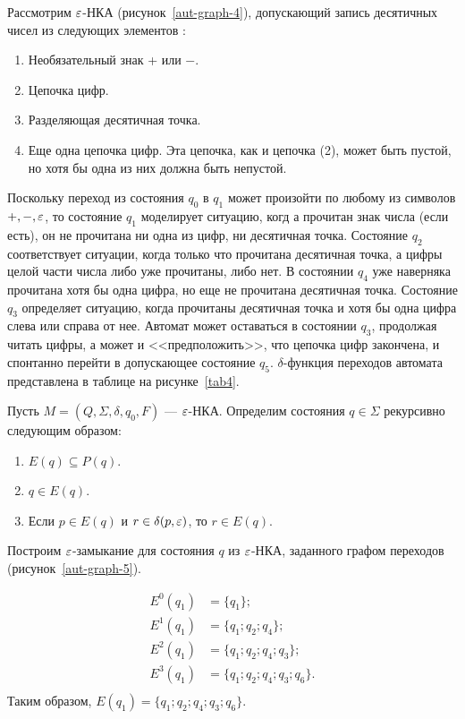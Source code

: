 \begin{myexample}
Рассмотрим $\varepsilon$-НКА (рисунок~\ref{aut-graph-4}), допускающий запись десятичных чисел из следующих элементов $\colon$
\begin{enumerate}
   \item Необязательный знак + или $-$.
   \item Цепочка цифр.
   \item Разделяющая десятичная точка.
   \item Еще одна цепочка цифр. Эта цепочка, как и цепочка (2), может быть пустой, но хотя бы одна из них должна быть непустой.
\end{enumerate}


Поскольку переход из состояния $q_0$ в $q_1$ может произойти по любому из символов $+, -, \varepsilon$, то состояние $q_1$ моделирует ситуацию, когд а прочитан знак числа (если есть), он не прочитана ни одна из цифр, ни десятичная точка. Состояние $q_2$ соответствует ситуации, когда только что прочитана десятичная точка, а цифры целой части числа либо уже прочитаны, либо нет. В состоянии $q_4$ уже наверняка прочитана хотя бы одна цифра, но еще не прочитана десятичная точка. Состояние $q_3$ определяет ситуацию, когда  прочитаны десятичная точка и хотя бы одна цифра слева или справа от нее. Автомат может оставаться в состоянии $q_3$, продолжая читать цифры, а может и <<предположить>>, что цепочка цифр закончена, и спонтанно перейти в допускающее состояние $q_5$.
$\delta$-функция переходов автомата представлена в таблице на рисунке~\ref{tab4}.
\end{myexample}



Пусть $M = (Q,\Sigma, \delta, q_0, F)$ --- $\varepsilon$-НКА. Определим  состояния $q \in \Sigma$ рекурсивно следующим образом:
\begin{enumerate}
   \item $E(q) \subseteq P(q)$.
   \item $q \in E(q)$.
   \item Если $p \in E(q)$ и $r \in \delta(p, \varepsilon)$, то $r \in E(q)$.
\end{enumerate}

\begin{myexample}
\label{example-413}
Построим $\varepsilon$-замыкание для состояния $q$ из $\varepsilon$-НКА, заданного графом переходов (рисунок~\ref{aut-graph-5}).

\begin{align*}
    E^0(q_1) &= \{q_1\}; \\
    E^1(q_1) &= \{ q_1; q_2; q_4 \};\\
    E^2(q_1) &= \{ q_1; q_2; q_4; q_3 \}; \\
    E^3(q_1) &= \{ q_1; q_2; q_4; q_3; q_6 \}. \\
\end{align*}
Таким образом, $E(q_1) = \{ q_1; q_2; q_4; q_3; q_6 \} $.
\end{myexample}

